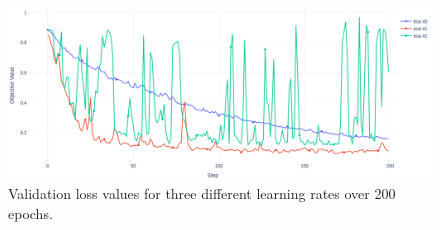 \begin{figure} [H]
    \centering 
    \includegraphics[width=1\linewidth]{PICTURES/loss_None.png} 
    \caption{Validation loss values for three different learning rates over 200 epochs.} \label{fig:loss-None} 
\end{figure}

